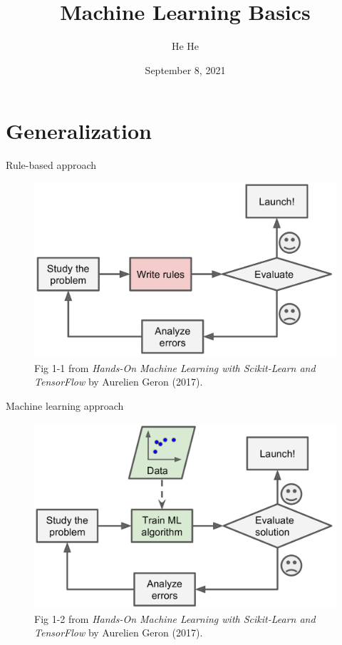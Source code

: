 \documentclass[usenames,dvipsnames,notes,11pt,aspectratio=169]{beamer}
\title[CSCI-GA.2590]{Machine Learning Basics}
\author[He He]{He He
}
\institute[NYU]{New York University}
\date{September 8, 2021}
\begin{document}
\begin{frame}
\titlepage
\end{frame}

\section{Generalization}

\begin{frame}
    {Rule-based approach}
\begin{figure}
\includegraphics[height=0.7\textheight]{figures/geron-fig1-1}
    \caption{{Fig 1-1 from \emph{Hands-On Machine Learning with Scikit-Learn and TensorFlow} by Aurelien Geron (2017).}}
\end{figure}
\end{frame}

\begin{frame}
    {Machine learning approach}
\begin{figure}
\includegraphics[height=0.7\textheight]{figures/geron-fig1-2}
    \caption{{Fig 1-2 from \emph{Hands-On Machine Learning with Scikit-Learn and TensorFlow} by Aurelien Geron (2017).}}
\end{figure}
\end{frame}
\end{document}

